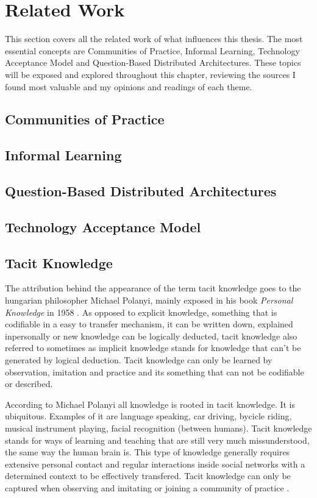 \chapter{Related Work}
\label{cha:relatedwork}

This section covers all the related work of what influences this thesis.
The most essential concepts are Communities of Practice, Informal Learning, 
Technology Acceptance Model 
and Question-Based Distributed Architectures.
These topics will be exposed and explored throughout this chapter, 
reviewing the sources I found most valuable and my opinions and 
readings of each theme.


\section{Communities of Practice}
\section{Informal Learning}
\section{Question-Based Distributed Architectures}
\section{Technology Acceptance Model}



\section{Tacit Knowledge}

The attribution behind the appearance of the term tacit knowledge goes to the 
hungarian philosopher Michael Polanyi, mainly exposed in his book 
\textit{Personal Knowledge} in 1958 \cite{tacitknowledgerevisited}.
As opposed to explicit knowledge, something that is codifiable in a easy to transfer
mechanism, it can be written down, explained inpersonally or new knowledge can be 
logically deducted, tacit knowledge also referred to
sometimes as implicit knowledge stands for knowledge that can't be generated by 
logical deduction. Tacit knowledge can only be learned by observation, imitation and
practice and its something that can not be codifiable or described. \cite{polanyi_1958}

According to Michael Polanyi all knowledge is rooted in tacit knowledge. It is 
ubiquitous. Examples of it are language speaking, car driving, bycicle riding, 
musical instrument playing, facial recognition (between humans). Tacit knowledge 
stands for ways of learning and teaching that are still very much missunderstood, the
same way the human brain is. This type of knowledge generally requires extensive 
personal contact and regular interactions inside social networks with a determined
context to be effectively transfered. Tacit knowledge can only be captured when 
observing and imitating or joining a community of practice \cite{goffin_koners_2011}.

